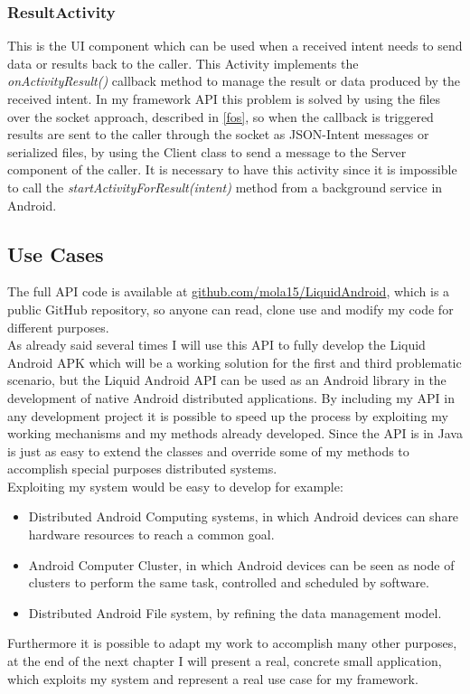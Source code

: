 \subsubsection{ResultActivity}
This is the UI component which can be used when a received intent needs to send data or results back to the caller. This Activity implements the \textit{onActivityResult()} callback method to manage the result or data produced by the received intent. In my framework API this problem is solved by using the files over the socket approach, described in \ref{fos}, so when the callback is triggered results are sent to the caller through the socket as JSON-Intent messages or serialized files, by using the Client class to send a message to the Server component of the caller. It is necessary to have this activity since it is impossible to call the \textit{startActivityForResult(intent)} method from a background service in Android.

\subsection{Use Cases}
The full API code is available at \href{https://github.com/mola15/LiquidAndroid}{github.com/mola15/LiquidAndroid}, which is a public GitHub repository, so anyone can read, clone use and modify my code for different purposes.\\
As already said several times I will use this API to fully develop the Liquid Android APK which will be a working solution for the first and third problematic scenario, but the Liquid Android API can be used as an Android library in the development of native Android distributed applications. By including my API in any development project it is possible to speed up the process by exploiting my working mechanisms and my methods already developed. Since the API is in Java is just as easy to extend the classes and override some of my methods to accomplish special purposes distributed systems.\\
Exploiting my system would be easy to develop for example:
\begin{itemize}
	\item Distributed Android Computing systems, in which Android devices can share hardware resources to reach a common goal.
	\item Android Computer Cluster, in which Android devices can be seen as node of clusters to perform the same task, controlled and scheduled by software.
	\item Distributed Android File system, by refining the data management model.
\end{itemize}
Furthermore it is possible to adapt my work to accomplish many other purposes, at the end of the next chapter I will present a real, concrete small application, which exploits my system and represent a real use case for my framework.

%
